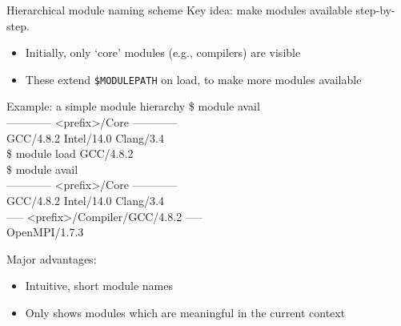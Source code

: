 \documentclass[10pt,xcolor={usenames,dvipsnames}]{beamer}
\begin{document}
\begin{frame}{Hierarchical module naming scheme}
    Key idea: make modules available step-by-step.
    \begin{itemize}
        \item
            Initially, only `core' modules (e.g., compilers) are visible
        \item
            These extend \texttt{\$MODULEPATH} on load, to make
            more modules available
    \end{itemize}
    \quad\quad
    \begin{minipage}{0.9\textwidth}
        \begin{exampleblock}{Example: a simple module hierarchy}
            \ttfamily
            \$ module avail\\
            ------------ <prefix>/Core ------------\\
            GCC/4.8.2 \quad Intel/14.0 \quad Clang/3.4\\
            \$ module load GCC/4.8.2\\
            \$ module avail\\
            ------------ <prefix>/Core ------------\\
            GCC/4.8.2 \quad Intel/14.0 \quad Clang/3.4\\
            ----- <prefix>/Compiler/GCC/4.8.2 -----\\
            OpenMPI/1.7.3
        \end{exampleblock}
    \end{minipage}

    \medskip
    Major advantages:
    \begin{itemize}
        \item
            Intuitive, short module names
        \item
            Only shows modules which are meaningful in the current context
    \end{itemize}
\end{frame}

\end{document}

